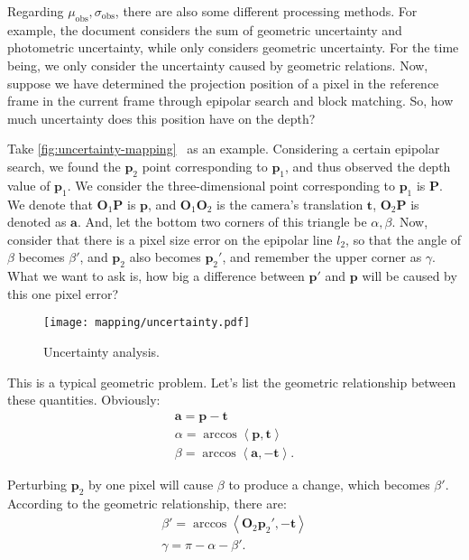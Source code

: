 Regarding $\mu_{\mathrm{obs}}, \sigma_{\mathrm{obs}}$, there are also some different processing methods. For example, the document \cite{Engel2013} considers the sum of geometric uncertainty and photometric uncertainty, while \cite{Vogiatzis2011} only considers geometric uncertainty. For the time being, we only consider the uncertainty caused by geometric relations. Now, suppose we have determined the projection position of a pixel in the reference frame in the current frame through epipolar search and block matching. So, how much uncertainty does this position have on the depth?

Take \autoref{fig:uncertainty-mapping}~ as an example. Considering a certain epipolar search, we found the $\bm{p}_2$ point corresponding to $\bm{p}_1$, and thus observed the depth value of $\bm{p}_1$. We consider the three-dimensional point corresponding to $\bm{ p}_1$ is $\bm{P}$. We denote that $\bm{O}_1 \bm{P}$ is $\bm{p}$, and $\bm{O}_1 \bm{O}_2$ is the camera's translation $\bm{t} $, $\bm{O}_2 \bm{P}$ is denoted as $\bm{a}$. And, let the bottom two corners of this triangle be $\alpha, \beta$. Now, consider that there is a pixel size error on the epipolar line $l_2$, so that the angle of $\beta$ becomes $\beta'$, and $\bm{p}_2$ also becomes $\bm{p }_2'$, and remember the upper corner as $\gamma$. What we want to ask is, how big a difference between $\bm{p}'$ and $\bm{p}$ will be caused by this one pixel error?

\begin{figure}[!ht]
	\centering
	\texttt{[image: mapping/uncertainty.pdf]}
	\caption{Uncertainty analysis.}
	\label{fig:uncertainty-mapping}
\end{figure}

This is a typical geometric problem. Let's list the geometric relationship between these quantities. Obviously:
\begin{equation}
	\begin{array}{l}
		\bm{a} = \bm{p} - \bm{t} \\
		\alpha  = \arccos \left\langle {\bm{p}, \bm{t}} \right\rangle \\
		\beta  = \arccos \left\langle {\bm{a}, - \bm{t}} \right\rangle .
	\end{array}
\end{equation}

Perturbing $\bm{p}_2$ by one pixel will cause $\beta$ to produce a change, which becomes $\beta'$. According to the geometric relationship, there are:
\begin{equation}
	\begin{array}{l}
		\beta ' = \arccos \left\langle {\bm{O}_2 \bm{p}_2', -\bm{t}} \right\rangle \\
		\gamma  = \pi  - \alpha  - \beta '.
	\end{array}
\end{equation}

